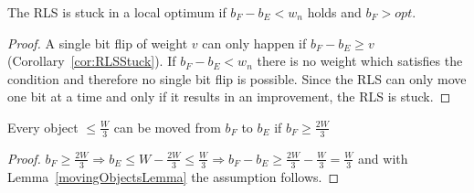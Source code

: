 \begin{corollary}\label{cor:RLSStuck}
    The RLS is stuck in a local optimum if \(b_F-b_E < w_n\) holds and \(b_F > opt\).
\end{corollary}
\begin{proof}
    A single bit flip of weight $v$ can only happen if \(b_F - b_E \ge v\) (Corollary~\ref{cor:RLSStuck}). If \(b_F-b_E < w_n\) there is no weight which satisfies the condition and therefore no single bit flip is possible.
    Since the RLS can only move one bit at a time and only if it results in an improvement, the RLS is stuck.
\end{proof}

\begin{corollary}\label{movingObjectsCorollary}
    Every object \(\le \frac{W}{3}\) can be moved from $b_F$ to $b_E$ if \(b_F \ge \frac{2W}{3}\)
\end{corollary}
\begin{proof}
    \(b_F \ge \frac{2W}{3} \Rightarrow b_E \le W - \frac{2W}{3} \le \frac{W}{3} \Rightarrow b_F - b_E \ge \frac{2W}{3} - \frac{W}{3} = \frac{W}{3}\) and with Lemma~\ref{movingObjectsLemma} the assumption follows.
\end{proof}

